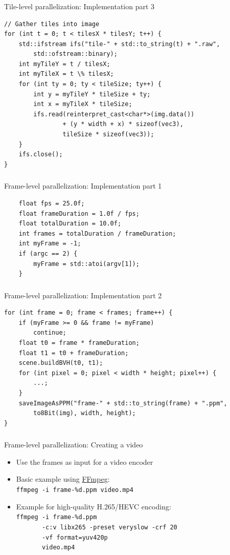 \documentclass[utf8,stillsansserifmath,fleqn,t]{beamer}
\newcommand{\code}[1]{\texttt{#1}}
\begin{document}
\begin{frame}[fragile]
\frametitle{\insertsection}
Tile-level parallelization: Implementation part 3
\begin{lstlisting}
// Gather tiles into image
for (int t = 0; t < tilesX * tilesY; t++) {
    std::ifstream ifs("tile-" + std::to_string(t) + ".raw",
        std::ofstream::binary);
    int myTileY = t / tilesX;
    int myTileX = t \% tilesX;
    for (int ty = 0; ty < tileSize; ty++) {
        int y = myTileY * tileSize + ty;
        int x = myTileX * tileSize;
        ifs.read(reinterpret_cast<char*>(img.data())
                + (y * width + x) * sizeof(vec3),
                tileSize * sizeof(vec3));
    }
    ifs.close();
}
\end{lstlisting}
\end{frame}

\begin{frame}[fragile]
\frametitle{\insertsection}
Frame-level parallelization: Implementation part 1
\begin{lstlisting}
    float fps = 25.0f;
    float frameDuration = 1.0f / fps;
    float totalDuration = 10.0f;
    int frames = totalDuration / frameDuration;
    int myFrame = -1;
    if (argc == 2) {
        myFrame = std::atoi(argv[1]);
    }
\end{lstlisting}
\end{frame}

\begin{frame}[fragile]
\frametitle{\insertsection}
Frame-level parallelization: Implementation part 2
\begin{lstlisting}
for (int frame = 0; frame < frames; frame++) {
    if (myFrame >= 0 && frame != myFrame)
        continue;
    float t0 = frame * frameDuration;
    float t1 = t0 + frameDuration;
    scene.buildBVH(t0, t1);
    for (int pixel = 0; pixel < width * height; pixel++) {
        ...;
    }
    saveImageAsPPM("frame-" + std::to_string(frame) + ".ppm",
        to8Bit(img), width, height);
}
\end{lstlisting}
\end{frame}

\begin{frame}
\frametitle{\insertsection}
Frame-level parallelization: Creating a video
\begin{itemize}
\item Use the frames as input for a video encoder
\item Basic example using \href{https://ffmpeg.org/}{FFmpeg}:\\
    \code{ffmpeg -i frame-\%d.ppm video.mp4}
\item Example for high-quality H.265/HEVC encoding:\\
    \code{ffmpeg -i frame-\%d.ppm}\\
    \code{~~~~~~~-c:v libx265 -preset veryslow -crf 20}\\
    \code{~~~~~~~-vf format=yuv420p}\\
    \code{~~~~~~~video.mp4}
\end{itemize}
\end{frame}
\end{document}
